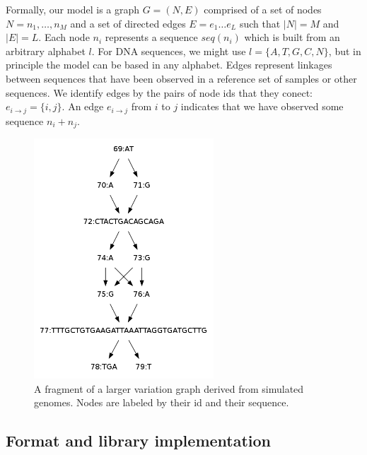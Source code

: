 \documentclass{article}
\begin{document}
Formally, our model is a graph $G = ( N, E )$ comprised of a set of nodes $N = n_1, \ldots ,n_M$ and a set of directed edges $E = e_1 \ldots e_L$ such that $|N| = M$ and $|E| = L$. Each node $n_i$ represents a sequence $seq(n_i)$ which is built from an arbitrary alphabet $l$.
For DNA sequences, we might use $l = \{ A, T, G, C, N \}$, but in principle the model can be based in any alphabet.
Edges represent linkages between sequences that have been observed in a reference set of samples or other sequences. We identify edges by the pairs of node ids that they conect: $e_{i \rightarrow j} = \{ i, j \}$.
An edge $e_{i \rightarrow j}$ from $i$ to $j$ indicates that we have observed some sequence $n_i + n_j$.

\begin{figure}[t]
\centering
\includegraphics[width=0.6\textwidth]{figures/variationgraph}
\caption{\label{fig:variationgraph}
A fragment of a larger variation graph derived from simulated genomes. Nodes are labeled by their id and their sequence.
}
\end{figure}

\subsection{Format and library implementation}
\end{document}
